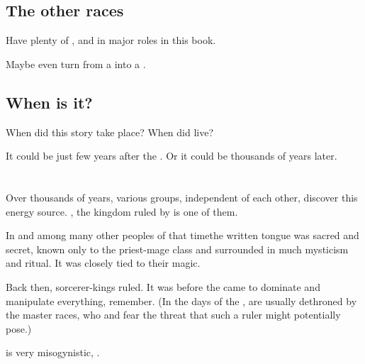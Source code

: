 \subsection{The other races}
Have plenty of \aryothim, \vorcanths{} and \quiljaaran{} in major roles in this book. 

Maybe even turn \Vexstrasshin{} from a \dragon{} into a \quiljaar. 









\subsection{When is it?}
When did this story take place? 
When did \Thanatzil{} live? 

It could be just few years after the .
Or it could be thousands of years later. 















\section{\Numah}
\index{\Numah}
Over thousands of years, various groups, independent of each other, discover this energy source. \Numah, the \nephilic{} kingdom ruled by  is one of them. 

In \Numah\dash and among many other \nephilic{} peoples of that time\dash the written tongue was sacred and secret, known only to the priest-mage class and surrounded in much mysticism and ritual. It was closely tied to their magic. 

Back then, sorcerer-kings ruled. 
It was before the \feud{} came to dominate and manipulate everything, remember. 
(In the days of the \charade,  are usually dethroned by the master races, who  and fear the threat that such a ruler might potentially pose.)

\Numah{} is very misogynistic, . 





